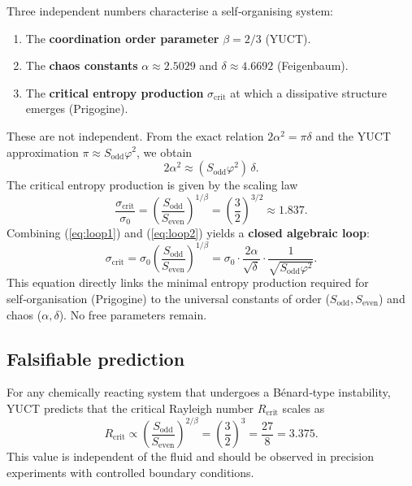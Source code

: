 \documentclass[12pt,a4paper]{article}
\begin{document}
{Three independent numbers characterise a self‑organising system:
\begin{enumerate}
	\item The \textbf{coordination order parameter} $\beta = 2/3$ (YUCT).
	\item The \textbf{chaos constants} $\alpha \approx 2.5029$ and $\delta \approx 4.6692$
	(Feigenbaum).
	\item The \textbf{critical entropy production} $\sigma_{\mathrm{crit}}$ at which a
	dissipative structure emerges (Prigogine).
\end{enumerate}
These are not independent.  From the exact relation $2\alpha^2 = \pi\delta$ and the
YUCT approximation $\pi \approx S_{\mathrm{odd}}\varphi^2$, we obtain
\begin{equation}
	2\alpha^2 \approx (S_{\mathrm{odd}}\varphi^2)\,\delta .
	\label{eq:loop1}
\end{equation}
The critical entropy production is given by the scaling law
\begin{equation}
	\frac{\sigma_{\mathrm{crit}}}{\sigma_0} = \left( \frac{S_{\mathrm{odd}}}{S_{\mathrm{even}}} \right)^{1/\beta}
	= \left( \frac{3}{2} \right)^{3/2} \approx 1.837 .
	\label{eq:loop2}
\end{equation}
Combining (\ref{eq:loop1}) and (\ref{eq:loop2}) yields a \textbf{closed algebraic loop}:
\[
\boxed{
	\sigma_{\mathrm{crit}} = \sigma_0 \left( \frac{S_{\mathrm{odd}}}{S_{\mathrm{even}}} \right)^{1/\beta}
	= \sigma_0 \cdot \frac{2\alpha}{\sqrt{\delta}} \cdot \frac{1}{\sqrt{S_{\mathrm{odd}}\varphi^2}} .
}
\]
This equation directly links the minimal entropy production required for self‑organisation
(Prigogine) to the universal constants of order ($S_{\mathrm{odd}},S_{\mathrm{even}}$) and
chaos ($\alpha,\delta$).  No free parameters remain.

\subsection{Falsifiable prediction}

For any chemically reacting system that undergoes a B\'{e}nard‑type instability,
YUCT predicts that the critical Rayleigh number $R_{\mathrm{crit}}$ scales as
\[
R_{\mathrm{crit}} \propto \left( \frac{S_{\mathrm{odd}}}{S_{\mathrm{even}}} \right)^{2/\beta}
= \left( \frac{3}{2} \right)^3 = \frac{27}{8} = 3.375 .
\]
This value is independent of the fluid and should be observed in precision
experiments with controlled boundary conditions.


}
\end{document}
